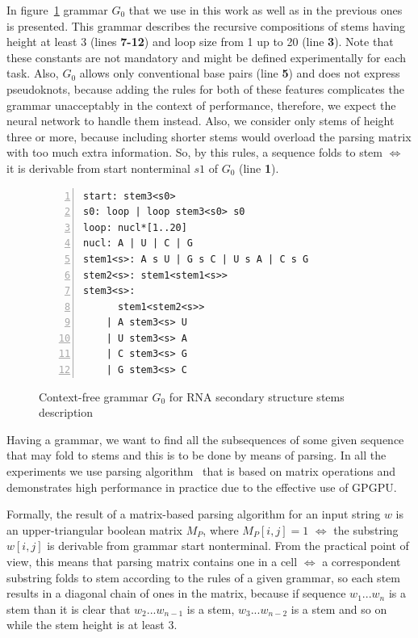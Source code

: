 \documentclass[runningheads]{llncs}
\begin{document}
In figure~\ref{gram} grammar $G_0$ that we use in this work as well as in the previous ones is presented. This grammar describes the recursive compositions of stems having height at least 3 (lines \textbf{7-12}) and loop size from 1 up to 20 (line \textbf{3}). Note that these constants are not mandatory and might be defined experimentally for each task. Also, $G_0$ allows only conventional base pairs (line \textbf{5}) and does not express pseudoknots, because adding the rules for both of these features complicates the grammar unacceptably in the context of performance, therefore, we expect the neural network to handle them instead. Also, we consider only stems of height three or more, because including shorter stems would overload the parsing matrix with too much extra information. So, by this rules, a sequence folds to stem $\iff$ it is derivable from start nonterminal $s1$ of $G_0$ (line \textbf{1}).

\begin{figure}[ht]
\begin{Verbatim}[numbers=left,xleftmargin=5mm]
start: stem3<s0>
s0: loop | loop stem3<s0> s0
loop: nucl*[1..20]
nucl: A | U | C | G
stem1<s>: A s U | G s C | U s A | C s G
stem2<s>: stem1<stem1<s>>
stem3<s>: 
      stem1<stem2<s>>
    | A stem3<s> U
    | U stem3<s> A
    | C stem3<s> G
    | G stem3<s> C
\end{Verbatim}
\caption{Context-free grammar $G_0$ for RNA secondary structure stems description}
\label{gram}
\end{figure}

Having a grammar, we want to find all the subsequences of some given sequence that may fold to stems and this is to be done by means of parsing. In all the experiments we use parsing algorithm~\cite{Azimov:2018:CPQ:3210259.3210264} that is based on matrix operations and demonstrates high performance in practice due to the effective use of GPGPU. 

Formally, the result of a matrix-based parsing algorithm for an input string $w$ is an upper-triangular boolean matrix $M_P$, where $M_P [i,j] = 1$ $\iff$ the substring $w[i,j]$ is derivable from grammar start nonterminal. From the practical point of view, this means that parsing matrix contains one in a cell $\iff$ a correspondent substring folds to stem according to the rules of a given grammar, so each stem results in a diagonal chain of ones in the matrix, because if sequence $w_1...w_n$ is a stem than it is clear that $w_2...w_{n - 1}$ is a stem, $w_3...w_{n - 2}$ is a stem and so on while the stem height is at least 3.
\end{document}
